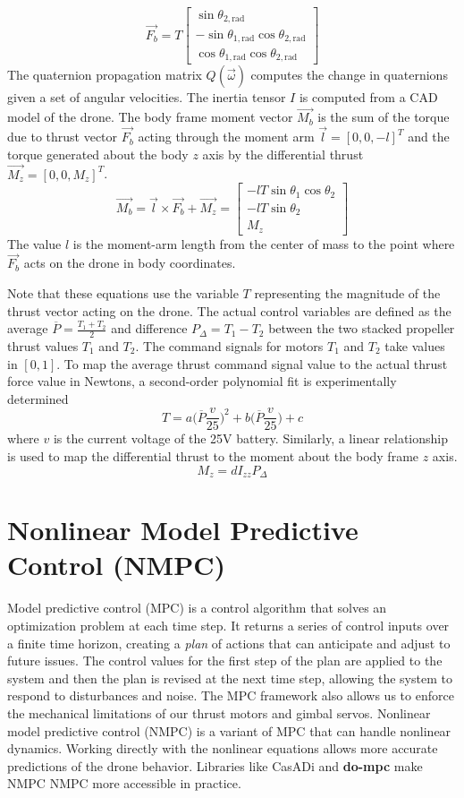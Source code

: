 \documentclass[conf]{new-aiaa}
\newcommand{\mpc}{MPC}
\newcommand{\nmpc}{NMPC}
\newcommand{\pdiff}{P_{\Delta}}
\newcommand{\pavg}{\overline{P}}
\newcommand{\casadi}{CasADi}
\newcommand{\dompc}{{\bf do-mpc}}
\begin{document}
\[
\vec{F_b} = T
\begin{bmatrix}
	\sin{\theta_{2,\text{rad}}}  \\
	-\sin{\theta_{1,\text{rad}}}\cos{\theta_{2,\text{rad}}}  \\
	\cos{\theta_{1,\text{rad}}}\cos{\theta_{2,\text{rad}}}
\end{bmatrix}
\]
The quaternion propagation matrix $Q(\vec{\omega})$ computes the change in quaternions given a set of angular velocities.
The inertia tensor $I$ is computed from a CAD model of the drone.
The body frame moment vector $\vec{M_b}$ is the sum of the torque due to thrust vector $\vec{F_b}$ acting through the moment arm $ \vec{l} = [0, 0, -l]^T$ and the torque generated about the body $z$ axis by the differential thrust $ \vec{M_z} = [0,0, M_z]^T$. 
\[
\vec{M_b} = \vec{l} \times \vec{F_b} + \vec{M_z}=       
\begin{bmatrix}
	-lT\sin{\theta_1}\cos{\theta_2}  \\
	-lT\sin{\theta_2}  \\
	M_z
\end{bmatrix}
\]
The value $l$ is the moment-arm length from the center of mass to the point where $\vec{F_b}$ acts on the drone in body coordinates. 

Note that these equations use the variable $T$ representing the magnitude of the thrust vector acting on the drone. 
The actual control variables are defined as the average $\pavg=\frac{T_1+T_2}{2}$ and difference $\pdiff = T_1-T_2$ between the two stacked propeller thrust values $T_1$ and $T_2$. The command signals for motors $T_1$ and $T_2$ take values in $[0,1]$. 
To map the average thrust command signal value to the actual thrust force value in Newtons, a second-order polynomial fit is experimentally determined
\[
T = a\Big(\pavg  \frac{v}{25}\Big)^2+b\Big(\pavg \frac{v}{25}\Big)+c
\]
where $v$ is the current voltage of the 25V battery. Similarly, a linear relationship is used to map the differential thrust to the moment about the body frame $z$ axis.
\[
M_z = d I_{zz} \pdiff
\]





	\section{Nonlinear Model Predictive Control (NMPC)}
	\label{nmpc}
Model predictive control (\mpc)  \cite{mpc} is a control algorithm that solves an optimization problem at each time step. It returns a series of control inputs over a finite time horizon, creating a {\em plan} of actions that can anticipate and adjust to future issues. The control values for the first step of the plan are applied to the system and then the plan is revised at the next time step, allowing the system to respond to disturbances and noise. The {\mpc} framework also allows us to enforce the mechanical limitations of our thrust motors and gimbal servos. Nonlinear model predictive control (\nmpc) is a variant of {\mpc} that can handle nonlinear dynamics.   Working directly with the nonlinear equations allows more accurate predictions of the drone behavior.  Libraries like {\casadi} \cite{casadi} and {\dompc} \cite{do-mpc} make {\nmpc} NMPC more accessible in practice.
\end{document}

